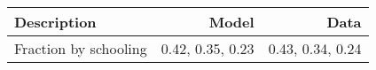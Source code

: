 \begin{tabular}{lrr}
\hline
Description & Model  & Data  \\ 
\hline
Fraction by schooling & 0.42, 0.35, 0.23  & 0.43, 0.34, 0.24  \\ 
\hline
\end{tabular}%
